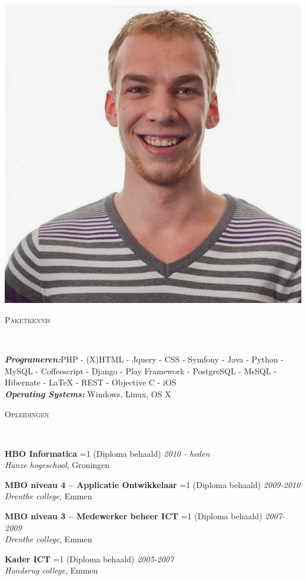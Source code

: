 \documentclass[9pt]{article}
\newenvironment{changemargin}[2]{%
  \begin{list}{}{%
    \setlength{\topsep}{0pt}%
    \setlength{\leftmargin}{#1}%
    \setlength{\rightmargin}{#2}%
    \setlength{\listparindent}{\parindent}%
    \setlength{\itemindent}{\parindent}%
    \setlength{\parsep}{\parskip}%
  }%
  \item[]}{\end{list}
}
\newcommand{\lineover}{
	\begin{changemargin}{-0.05in}{-0.05in}
		\vspace*{-8pt}
		\hrulefill \\
		\vspace*{-2pt}
	\end{changemargin}
}
\newcommand{\header}[1]{
	\begin{changemargin}{-0.5in}{-0.5in}
		\scshape{\niceHeadSmall#1}\\
  	\lineover
	\end{changemargin}
}
\newenvironment{body} {
	\vspace*{-16pt}
	\begin{changemargin}{-0.25in}{-0.5in}
  }	
	{\end{changemargin}
}
\newcommand{\school}[5]{
	\textbf{#1}
	\ifnum#5=1
		(Diploma behaald)
	\fi
	 \hfill \emph{#2\\}
	\emph{#3},  
	#4\\
	\medskip
}
\begin{document}
\begin{body}
\begin{minipage}[c]{0.30\textwidth}
\begin{flushright}
			\includegraphics[width=1\textwidth,frame]{pasfoto}
		\end{flushright}
	\end{minipage}
\end{body}

\smallskip

\header{Paketkennis}

\begin{body}
	\vspace{14pt}
	\emph{\textbf{Programeren:}}PHP - (X)HTML - Jquery - CSS - Symfony - Java - Python - MySQL - Coffeescript - Django - Play Framework - PostgreSQL - MsSQL - Hibernate - LaTeX - REST - Objective C - iOS\\
	\medskip
	\emph{\textbf{Operating Systems:}} Windows, Linux, OS X\\
\end{body}

\smallskip
\header{Opleidingen}
\begin{body}
	\vspace{14pt}
	\school{HBO Informatica}{2010 - heden}{Hanze hogeschool}{Groningen}{0}
	\school{MBO niveau 4 -- Applicatie Ontwikkelaar}{2009-2010}{Drenthe college}{Emmen}{1}
	\school{MBO niveau 3 -- Medewerker beheer ICT}{2007-2009}{Drenthe college}{Emmen}{1}
	\school{Kader ICT}{2005-2007}{Hondsrug college}{Emmen}{1}
\end{body}
\end{document}
